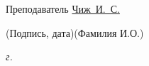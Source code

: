 \begin{titlepage}
	\bigskip
	
	\noindent Преподаватель  \hfill \underline{\hspace{4cm}}\quad
	\underline{\hspace{1cm}Чиж~И.~С.\hspace{1cm}}
	
	\vspace{-2ex}
	\noindent\hspace{13.5ex}\normalsize\hspace{170pt}\hspace{2ex}\scriptsize{(Подпись, дата)}\normalsize\hspace{30pt}\hspace{6ex}\scriptsize{(Фамилия И.О.)}\normalsize
	\vfill
	
	
	
	
	\begin{center}
		\textsl{\the\year{} г.}
	\end{center}
\end{titlepage}
